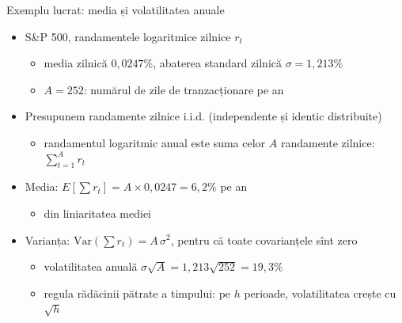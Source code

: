 \begin{frame}{Exemplu lucrat: media și volatilitatea anuale}
\itemsize{\small}
\begin{itemize}
    \item S\&P 500, randamentele logaritmice zilnice $r_t$
    \begin{itemize}
        \item media zilnică $0{,}0247\%$, abaterea standard zilnică $\sigma = 1{,}213\%$
        \item $A = 252$: numărul de zile de tranzacționare pe an
    \end{itemize}
    \item Presupunem randamente zilnice i.i.d. (independente și identic distribuite)
    \begin{itemize}
        \item randamentul logaritmic anual este suma celor $A$ randamente zilnice: $\sum_{t=1}^{A} r_t$
    \end{itemize}
    \item Media: $E[\sum r_t] = A \times 0{,}0247 = 6{,}2\%$ pe an
    \begin{itemize}
        \item din liniaritatea mediei
    \end{itemize}
    \item Varianța: $\text{Var}(\sum r_t) = A\,\sigma^2$, pentru că toate covarianțele sînt zero
    \begin{itemize}
        \item volatilitatea anuală $\sigma\sqrt{A} = 1{,}213\sqrt{252} = 19{,}3\%$
        \item regula rădăcinii pătrate a timpului: pe $h$ perioade, volatilitatea crește cu $\sqrt{h}$
    \end{itemize}
\end{itemize}
\end{frame}

